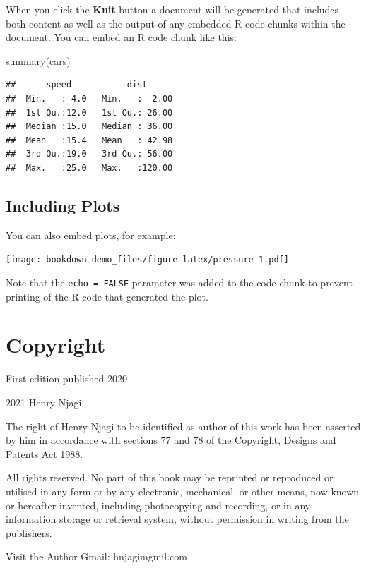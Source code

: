 \documentclass[
]{book}
\newenvironment{Shaded}{\begin{snugshade}}{\end{snugshade}}
\newcommand{\FunctionTok}[1]{\textcolor[rgb]{0.00,0.00,0.00}{#1}}
\newcommand{\NormalTok}[1]{#1}
\begin{document}
When you click the \textbf{Knit} button a document will be generated that includes both content as well as the output of any embedded R code chunks within the document. You can embed an R code chunk like this:

\begin{Shaded}
\begin{Highlighting}[]
\FunctionTok{summary}\NormalTok{(cars)}
\end{Highlighting}
\end{Shaded}

\begin{verbatim}
##      speed           dist       
##  Min.   : 4.0   Min.   :  2.00  
##  1st Qu.:12.0   1st Qu.: 26.00  
##  Median :15.0   Median : 36.00  
##  Mean   :15.4   Mean   : 42.98  
##  3rd Qu.:19.0   3rd Qu.: 56.00  
##  Max.   :25.0   Max.   :120.00
\end{verbatim}

\hypertarget{including-plots}{%
\section{Including Plots}\label{including-plots}}

You can also embed plots, for example:

\texttt{[image: bookdown-demo\_files/figure-latex/pressure-1.pdf]}

Note that the \texttt{echo\ =\ FALSE} parameter was added to the code chunk to prevent printing of the R code that generated the plot.

\hypertarget{copyright}{%
\chapter{Copyright}\label{copyright}}

First edition published 2020

2021 Henry Njagi

The right of Henry Njagi to be identified as author of this work has been asserted by him in accordance with sections 77 and 78 of the Copyright, Designs and Patents Act 1988.

All rights reserved. No part of this book may be reprinted or reproduced or utilised in any form or by any electronic, mechanical, or other means, now known or hereafter invented, including photocopying and recording, or in any information storage or retrieval system, without permission in writing from the publishers.

Visit the Author Gmail: hnjagimgmil.com

  
\end{document}
